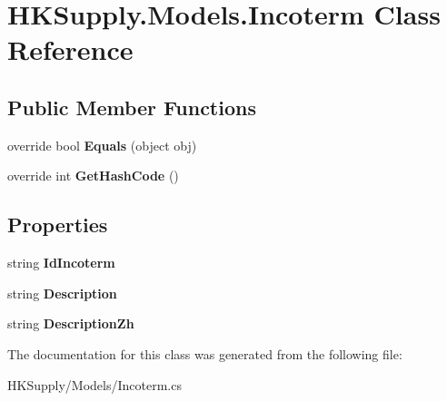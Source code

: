 \hypertarget{class_h_k_supply_1_1_models_1_1_incoterm}{}\section{H\+K\+Supply.\+Models.\+Incoterm Class Reference}
\label{class_h_k_supply_1_1_models_1_1_incoterm}
\subsection*{Public Member Functions}
\begin{DoxyCompactItemize}
\item 
\mbox{\label{class_h_k_supply_1_1_models_1_1_incoterm_a9dccd041787d69695b1fc96bb0d1ebc1}} 
override bool {\bfseries Equals} (object obj)
\item 
\mbox{\label{class_h_k_supply_1_1_models_1_1_incoterm_a1976815be0a29915d1951975100c358c}} 
override int {\bfseries Get\+Hash\+Code} ()
\end{DoxyCompactItemize}
\subsection*{Properties}
\begin{DoxyCompactItemize}
\item 
\mbox{\label{class_h_k_supply_1_1_models_1_1_incoterm_af6613e0282b4e63d78fdfcad1dd75da5}} 
string {\bfseries Id\+Incoterm}
\item 
\mbox{\label{class_h_k_supply_1_1_models_1_1_incoterm_a3b03f36cbbd8df1efe60cfd6bede1585}} 
string {\bfseries Description}
\item 
\mbox{\label{class_h_k_supply_1_1_models_1_1_incoterm_ad9cab47ec4f903b62dfa87bf66027667}} 
string {\bfseries Description\+Zh}
\end{DoxyCompactItemize}


The documentation for this class was generated from the following file\+:\begin{DoxyCompactItemize}
\item 
H\+K\+Supply/\+Models/Incoterm.\+cs\end{DoxyCompactItemize}
